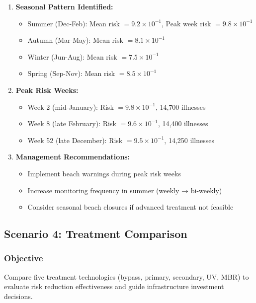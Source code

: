 \documentclass[11pt,a4paper]{article}
\begin{document}
\begin{enumerate}[leftmargin=*]
    \item \textbf{Seasonal Pattern Identified:}
    \begin{itemize}
        \item Summer (Dec-Feb): Mean risk $= 9.2 \times 10^{-1}$, Peak week risk $= 9.8 \times 10^{-1}$
        \item Autumn (Mar-May): Mean risk $= 8.1 \times 10^{-1}$
        \item Winter (Jun-Aug): Mean risk $= 7.5 \times 10^{-1}$
        \item Spring (Sep-Nov): Mean risk $= 8.5 \times 10^{-1}$
    \end{itemize}

    \item \textbf{Peak Risk Weeks:}
    \begin{itemize}
        \item Week 2 (mid-January): Risk $= 9.8 \times 10^{-1}$, 14,700 illnesses
        \item Week 8 (late February): Risk $= 9.6 \times 10^{-1}$, 14,400 illnesses
        \item Week 52 (late December): Risk $= 9.5 \times 10^{-1}$, 14,250 illnesses
    \end{itemize}

    \item \textbf{Management Recommendations:}
    \begin{itemize}
        \item Implement beach warnings during peak risk weeks
        \item Increase monitoring frequency in summer (weekly → bi-weekly)
        \item Consider seasonal beach closures if advanced treatment not feasible
    \end{itemize}
\end{enumerate}

\subsection{Scenario 4: Treatment Comparison}

\subsubsection{Objective}

Compare five treatment technologies (bypass, primary, secondary, UV, MBR) to evaluate risk reduction effectiveness and guide infrastructure investment decisions.
\end{document}
